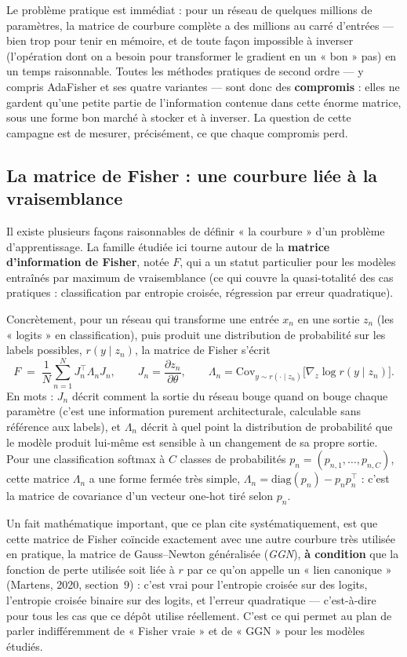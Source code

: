 \documentclass[11pt,a4paper]{article}
\newcommand{\eng}[1]{\emph{#1}}
\begin{document}
Le problème pratique est immédiat : pour un réseau de quelques millions de paramètres, la matrice de
courbure complète a des millions au carré d'entrées — bien trop pour tenir en mémoire, et de toute
façon impossible à inverser (l'opération dont on a besoin pour transformer le gradient en un « bon »
pas) en un temps raisonnable. Toutes les méthodes pratiques de second ordre — y compris AdaFisher et
ses quatre variantes — sont donc des \textbf{compromis} : elles ne gardent qu'une petite partie de
l'information contenue dans cette énorme matrice, sous une forme bon marché à stocker et à inverser.
La question de cette campagne est de mesurer, précisément, ce que chaque compromis perd.

\subsection{La matrice de Fisher : une courbure liée à la vraisemblance}

Il existe plusieurs façons raisonnables de définir « la courbure » d'un problème d'apprentissage. La
famille étudiée ici tourne autour de la \textbf{matrice d'information de Fisher}, notée $F$, qui a
un statut particulier pour les modèles entraînés par maximum de vraisemblance (ce qui couvre la
quasi-totalité des cas pratiques : classification par entropie croisée, régression par erreur
quadratique).

Concrètement, pour un réseau qui transforme une entrée $x_n$ en une sortie $z_n$ (les « logits » en
classification), puis produit une distribution de probabilité sur les labels possibles,
$r(y\mid z_n)$, la matrice de Fisher s'écrit
\[
F \;=\; \frac1N\sum_{n=1}^N J_n^\top \Lambda_n J_n,
\qquad J_n = \frac{\partial z_n}{\partial\theta}, \qquad
\Lambda_n = \mathrm{Cov}_{y\sim r(\cdot\mid z_n)}\!\big[\nabla_z \log r(y\mid z_n)\big].
\]
En mots : $J_n$ décrit comment la sortie du réseau bouge quand on bouge chaque paramètre (c'est une
information purement architecturale, calculable sans référence aux labels), et $\Lambda_n$ décrit à
quel point la distribution de probabilité que le modèle produit lui-même est sensible à un
changement de sa propre sortie. Pour une classification softmax à $C$ classes de probabilités
$p_n=(p_{n,1},\dots,p_{n,C})$, cette matrice $\Lambda_n$ a une forme fermée très simple,
$\Lambda_n=\mathrm{diag}(p_n)-p_np_n^\top$ : c'est la matrice de covariance d'un vecteur one-hot
tiré selon $p_n$.

Un fait mathématique important, que ce plan cite systématiquement, est que cette matrice de Fisher
coïncide exactement avec une autre courbure très utilisée en pratique, la matrice de
Gauss--Newton généralisée (\eng{GGN}), \textbf{à condition} que la fonction de perte utilisée soit
liée à $r$ par ce qu'on appelle un « lien canonique » (Martens, 2020, section~9) : c'est vrai pour
l'entropie croisée sur des logits, l'entropie croisée binaire sur des logits, et l'erreur
quadratique — c'est-à-dire pour tous les cas que ce dépôt utilise réellement. C'est ce qui permet au
plan de parler indifféremment de « Fisher vraie » et de « GGN » pour les modèles étudiés.
\end{document}
